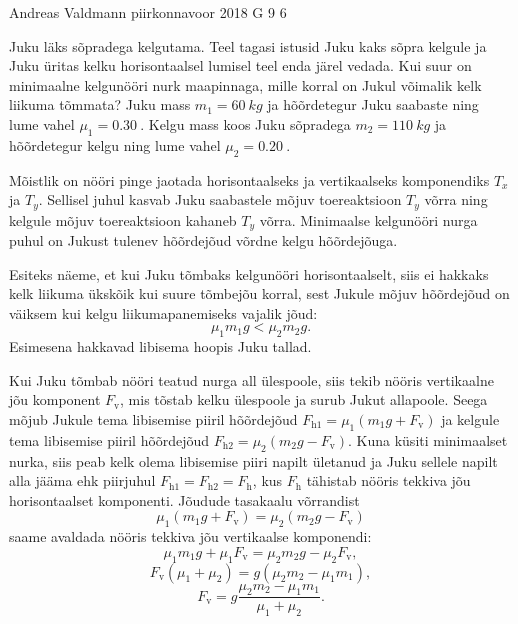 {Andreas Valdmann} %
{piirkonnavoor} %
{2018} %
{G 9} %
{6} %
{
\ifStatement
Juku läks sõpradega kelgutama. Teel tagasi istusid Juku kaks sõpra kelgule ja Juku üritas kelku horisontaalsel lumisel teel enda järel vedada. Kui suur on minimaalne kelgunööri nurk maapinnaga, mille korral on Jukul võimalik kelk liikuma tõmmata? Juku mass $m_1 = \SI{60}{kg}$ ja hõõrdetegur Juku saabaste ning lume vahel $\mu_1 = \SI{0.30}{}$. Kelgu mass koos Juku sõpradega $m_2 = \SI{110}{kg}$ ja hõõrdetegur kelgu ning lume vahel $\mu_2 = \SI{0.20}{}$.
\fi


\ifHint
Mõistlik on nööri pinge jaotada horisontaalseks ja vertikaalseks komponendiks $T_x$ ja $T_y$. Sellisel juhul kasvab Juku saabastele mõjuv toereaktsioon $T_y$ võrra ning kelgule mõjuv toereaktsioon kahaneb $T_y$ võrra. Minimaalse kelgunööri nurga puhul on Jukust tulenev hõõrdejõud võrdne kelgu hõõrdejõuga.
\fi


\ifSolution
Esiteks näeme, et kui Juku tõmbaks kelgunööri horisontaalselt, siis ei hakkaks kelk liikuma ükskõik kui suure tõmbejõu korral, sest Jukule mõjuv hõõrdejõud on väiksem kui kelgu liikumapanemiseks vajalik jõud:
\[
\mu_1 m_1 g < \mu_2 m_2 g.
\]
Esimesena hakkavad libisema hoopis Juku tallad.

Kui Juku tõmbab nööri teatud nurga all ülespoole, siis tekib nööris vertikaalne jõu komponent $F_{\mathrm{v}}$, mis tõstab kelku ülespoole ja surub Jukut allapoole. Seega mõjub Jukule tema libisemise piiril hõõrdejõud $F_{\mathrm{h}1} = \mu_1 \left(m_1 g + F_{\mathrm{v}}\right)$ ja kelgule tema libisemise piiril hõõrdejõud $F_{\mathrm{h}2} = \mu_2 \left(m_2 g - F_{\mathrm{v}}\right)$. Kuna küsiti minimaalset nurka, siis peab kelk olema libisemise piiri napilt ületanud ja Juku sellele napilt alla jääma ehk piirjuhul $F_{\mathrm{h}1} = F_{\mathrm{h}2} = F_{\mathrm{h}}$, kus $F_{\mathrm{h}}$ tähistab nööris tekkiva jõu horisontaalset komponenti.
Jõudude tasakaalu võrrandist
\begin{equation*}
\mu_1 \left(m_1 g + F_{\mathrm{v}}\right) = \mu_2 \left(m_2 g - F_{\mathrm{v}}\right)
\end{equation*}
saame avaldada nööris tekkiva jõu vertikaalse komponendi:
\begin{equation*}
\mu_1 m_1 g + \mu_1 F_{\mathrm{v}} = \mu_2 m_2 g - \mu_2 F_{\mathrm{v}},
\end{equation*}
\begin{equation*}
F_{\mathrm{v}} \left(\mu_1 + \mu_2\right) = g\left(\mu_2 m_2 - \mu_1 m_1\right),
\end{equation*}
\begin{equation*}
F_{\mathrm{v}} = g\frac{\mu_2 m_2 - \mu_1 m_1}{\mu_1 + \mu_2}.
\end{equation*}

}
